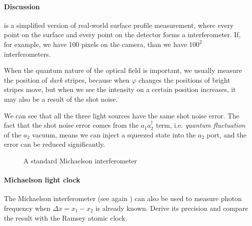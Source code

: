 \documentclass[hyperref, a4paper]{article}
\begin{document}
\paragraph{Discussion}  is a simplified version of real-world surface profile measurement, 
where every point on the surface and every point on the detector forms a interferometer.
If, for example, we have 100 pixels on the camera, than we have $100^2$ interferometers.

When the quantum nature of the optical field is important, we usually measure the position of \emph{dark} 
stripes, because when $\varphi$ changes the positions of bright stripes move, but when we see the intensity 
on a certain position increases, it may also be a result of the shot noise. 

We can see that all the three light sources have the same shot noise error. 
The fact that the shot noise error comes from the $a_1 a_2^\dagger$ term, i.e. \emph{quantum fluctuation} 
of the $a_2$ vacuum, means we can inject a squeezed state into the $a_2$ port, and the error can be 
reduced significantly.

\begin{figure}
    \centering
    
    \caption{A standard Michaelson interferometer}
    \label{fig:michaelson}
\end{figure}

\paragraph{}

\paragraph{Michaelson light clock} The Michaelson interferometer (see again ) can also be used
to measure photon frequency when $\Delta x = x_1 - x_2$ is already known. Derive its precision and compare the result with 
the Ramsey atomic clock.
\end{document}
